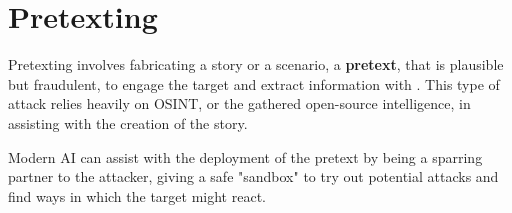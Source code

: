 \section{Pretexting}

Pretexting involves fabricating a story or a scenario, a \textbf{pretext}, that is plausible but fraudulent, to engage the target and extract information with \citep{conteh_cybersecurityrisks_2016}. This type of attack relies heavily on OSINT, or the gathered open-source intelligence, in assisting with the creation of the story.

Modern AI can assist with the deployment of the pretext by being a sparring partner to the attacker, giving a safe "sandbox" to try out potential attacks and find ways in which the target might react.















